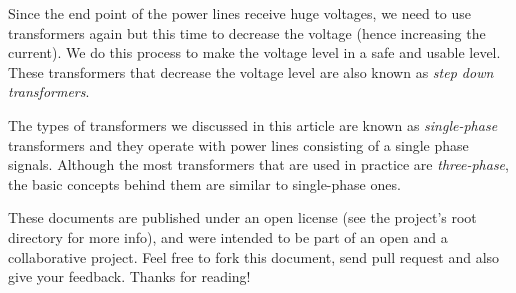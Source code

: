 \documentclass{article}
\begin{document}
	Since the end point of the power lines receive huge voltages, we need to use transformers again but this time to decrease the voltage (hence increasing the current).
	We do this process to make the voltage level in a safe and usable level. These transformers that decrease the voltage level are also known as \textit{step down transformers}.
	
	The types of transformers we discussed in this article are known as \textit{single-phase} transformers and they operate with power lines consisting of a single phase signals. 
	Although the most transformers that are used in practice are \textit{three-phase}, the basic concepts behind them are similar to single-phase ones.
	
	These documents are published under an open license (see the project's root directory for more info), and were intended to be part of an open and a collaborative project. Feel free to fork this document, send pull request and also give your feedback. Thanks for reading!
	
\end{document}

